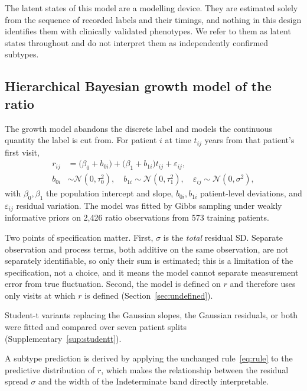 \documentclass[11pt]{article}
\begin{document}
The latent states of this model are a modelling device. They are estimated solely
from the sequence of recorded labels and their timings, and nothing in this
design identifies them with clinically validated phenotypes. We refer to them as
latent states throughout and do not interpret them as independently confirmed
subtypes.

\subsection{Hierarchical Bayesian growth model of the ratio}
\label{sec:hb}
The growth model abandons the discrete label and models the continuous quantity
the label is cut from. For patient $i$ at time $t_{ij}$ years from that patient's
first visit,
\begin{align}
r_{ij} &= \bigl(\beta_0 + b_{0i}\bigr) + \bigl(\beta_1 + b_{1i}\bigr) t_{ij} + \varepsilon_{ij},
\label{eq:hb}\\[2pt]
b_{0i} &\sim \mathcal{N}(0, \tau_0^2), \quad
b_{1i} \sim \mathcal{N}(0, \tau_1^2), \quad
\varepsilon_{ij} \sim \mathcal{N}(0, \sigma^2),
\nonumber
\end{align}
with $\beta_0, \beta_1$ the population intercept and slope, $b_{0i}, b_{1i}$
patient-level deviations, and $\varepsilon_{ij}$ residual variation. The model was
fitted by Gibbs sampling under weakly informative priors on 2,426 ratio
observations from 573 training patients.

Two points of specification matter. First, $\sigma$ is the \emph{total} residual
SD. Separate observation and process terms, both additive on the same
observation, are not separately identifiable, so only their sum is estimated;
this is a limitation of the specification, not a choice, and it means the model
cannot separate measurement error from true fluctuation. Second, the model is
defined on $r$ and therefore uses only visits at which $r$ is defined
(Section~\ref{sec:undefined}).

Student-t variants replacing the Gaussian slopes, the Gaussian residuals, or both
were fitted and compared over seven patient splits
(Supplementary~\ref{sup:studentt}).

A subtype prediction is derived by applying the unchanged rule~\eqref{eq:rule} to
the predictive distribution of $r$, which makes the relationship between the
residual spread $\sigma$ and the width of the Indeterminate band directly
interpretable.
\end{document}
